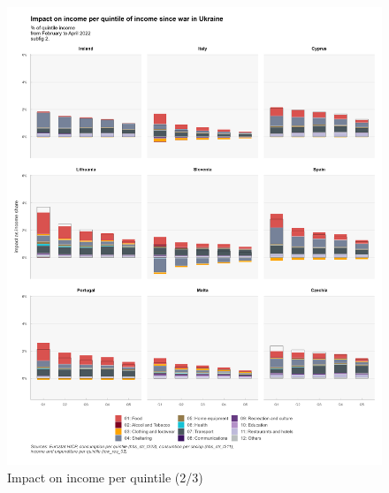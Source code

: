 \documentclass[
  9pt,
  a4paper,
  DIV=11,
  numbers=noendperiod]{scrartcl}
\begin{document}
\begin{figure}

\caption{Impact on income per quintile (2/3)}

{\centering \includegraphics[width=16cm,height=\textheight]{../svg/coicop_l1_wiu_2.png}

}

\end{figure}
\end{document}
